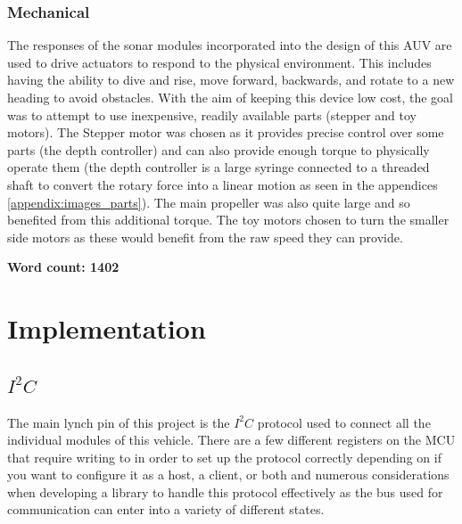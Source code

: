 \documentclass[11pt,a4paper,titlepage]{report}
\begin{document}
	\subsection*{Mechanical}
	The responses of the sonar modules incorporated into the design of this AUV are used to drive actuators to respond to the physical environment. This includes having the ability to dive and rise, move forward, backwards, and rotate to a new heading to avoid obstacles. With the aim of keeping this device low cost, the goal was to attempt to use inexpensive, readily available parts (stepper and toy motors). The Stepper motor was chosen as it provides precise control over some parts (the depth controller) and can also provide enough torque to physically operate them (the depth controller is a large syringe connected to a threaded shaft to convert the rotary force into a linear motion as seen in the appendices \ref{appendix:images_parts}). The main propeller was also quite large and so benefited from this additional torque. The toy motors chosen to turn the smaller side motors as these would benefit from the raw speed they can provide. 
	
	\textbf{Word count: 1402}
	
	\chapter*{Implementation}
	
	\section*{$I^{2}C$}
	The main lynch pin of this project is the $I^{2}C$ protocol used to connect all the individual modules of this vehicle. There are a few different registers on the MCU that require writing to in order to set up the protocol correctly depending on if you want to configure it as a host, a client, or both and numerous considerations when developing a library to handle this protocol effectively as the bus used for communication can enter into a variety of different states. 
	
\end{document}
